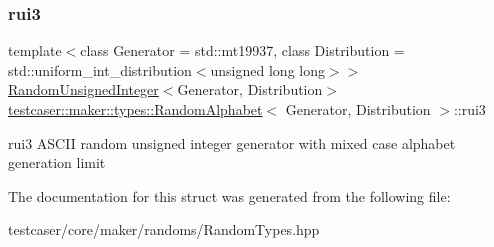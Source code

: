 \subsubsection{\texorpdfstring{rui3}{rui3}}
{\footnotesize\ttfamily template$<$class Generator = std\+::mt19937, class Distribution = std\+::uniform\+\_\+int\+\_\+distribution$<$unsigned long long$>$$>$ \\
\mbox{\hyperlink{classtestcaser_1_1maker_1_1types_1_1RandomUnsignedInteger}{Random\+Unsigned\+Integer}}$<$Generator, Distribution$>$ \mbox{\hyperlink{structtestcaser_1_1maker_1_1types_1_1RandomAlphabet}{testcaser\+::maker\+::types\+::\+Random\+Alphabet}}$<$ Generator, Distribution $>$\+::rui3}



rui3 A\+S\+C\+II random unsigned integer generator with mixed case alphabet generation limit 



The documentation for this struct was generated from the following file\+:\begin{DoxyCompactItemize}
\item 
testcaser/core/maker/randoms/Random\+Types.\+hpp\end{DoxyCompactItemize}
